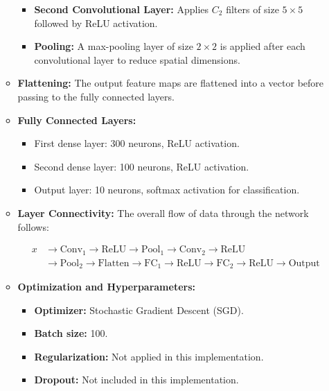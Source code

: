 \begin{enumerate}
\begin{itemize}
\begin{itemize}
        \item \textbf{Second Convolutional Layer:} Applies \(C_2\) filters of 
        size \(5 \times 5\) followed by ReLU activation.
        
        \item \textbf{Pooling:} A max-pooling layer of size \(2 \times 2\) is 
        applied after each convolutional layer to reduce spatial dimensions.
    \end{itemize}
    
    \item \textbf{Flattening:} The output feature maps are flattened into a 
    vector before passing to the fully connected layers.

    \item \textbf{Fully Connected Layers:} 
    \begin{itemize}
        \item First dense layer: 300 neurons, ReLU activation.
        \item Second dense layer: 100 neurons, ReLU activation.
        \item Output layer: 10 neurons, softmax activation for classification.
    \end{itemize}
    
    \item \textbf{Layer Connectivity:} The overall flow of data through the 
    network follows:
    
    \begin{align*}
    x &\rightarrow \text{Conv}_1 \rightarrow \text{ReLU} \rightarrow 
    \text{Pool}_1 \rightarrow \text{Conv}_2 \rightarrow \text{ReLU} \\
    &\rightarrow \text{Pool}_2 \rightarrow \text{Flatten} \rightarrow 
    \text{FC}_1 \rightarrow \text{ReLU} \rightarrow \text{FC}_2 \rightarrow 
    \text{ReLU} \rightarrow \text{Output}
    \end{align*}
    
    \item \textbf{Optimization and Hyperparameters:} 
    \begin{itemize}
        \item \textbf{Optimizer:} Stochastic Gradient Descent (SGD).
        \item \textbf{Batch size:} 100.
        \item \textbf{Regularization:} Not applied in this implementation.
        \item \textbf{Dropout:} Not included in this implementation.
    \end{itemize}
\end{itemize}


\end{enumerate}
